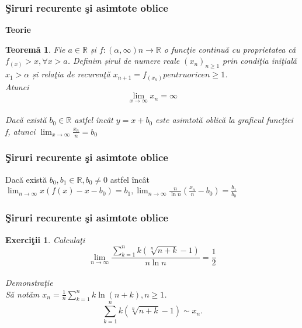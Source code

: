\documentclass{beamer}
\theoremstyle{plain}
\newtheorem{te}[de]{Teorem\u a }
\newtheorem{ex}[de]{Exerci\c tii}
\begin{document}
\frame
{
\frametitle{\c Siruri recurente \c si asimtote oblice}
\textbf{Teorie}
\begin{te}
Fie \(a\in \mathbb{R}\) și \(f: \left ( \alpha ,\infty  \right )n \to \mathbb{R}\) o func\c tie continu\u a cu proprietatea c\u a \(f_{(x)}> x, \forall x > a\). Definim șirul de numere reale \(\left ( x_{n} \right )_{n\geq 1}\) prin condi\c tia ini\c tial\u a \(x_{1}> \alpha\) și rela\c tia de recuren\c t\u a \(x_{n+1} = f_{\left ( x_{n} \right )} pentru orice  n\geq 1\).
\\ Atunci 
\begin{displaymath}
 \lim_{x \to \infty }x_{n} = \infty
\end{displaymath}
\\ Dac\u a exist\u a \(b_{0}\in \mathbb{R}\) astfel \^ inc\^ at \(y = x + b_{0}\) este asimtot\u a oblic\u a la graficul func\c tiei f, atunci
\(\lim_{x \to \infty }\frac{x_{n}}{n}=b_{0}\)
\end{te}
}
\frame
{
\frametitle{\c Siruri recurente \c si asimtote oblice}
Dac\u a exist\u a \(b_{0}, b_{1}\in \mathbb{R}, b_{0 }\neq 0\) astfel \^ inc\^ at 
\(\lim_{n \to \infty }x\left ( f\left ( x \right )-x-b_{0} \right )= b_{1},
\lim_{n \to \infty } \frac{n}{\ln n}\left ( \frac{x_{n}}{n} -b_{0}\right )=\frac{b_{1}}{b_{0}}\)

}
\frame
{
\frametitle{\c Siruri recurente \c si asimtote oblice}
\begin{ex}
Calcula\c ti
\begin{displaymath}
 \lim_{n \to \infty }\frac{\sum_{k=1}^{n}k\left ( \sqrt[n]{n+k} -1\right )}{n\ln n } = \frac{1}{2}
\end{displaymath}
\\ Demonstra\c tie 
\\ S\u a not\u am \(x_{n} = \frac{1}{n}\sum_{k=1}^{n} k \ln \left ( n+k \right ), n \geq 1\). 
\begin{displaymath}
 \sum_{k=1}^{n}k\left ( \sqrt[n]{n+k}-1 \right )\sim x_{n}. \label{eq:2.1} \tag{2.1}
\end{displaymath}
\end{ex}
}
\frame
\end{document}
